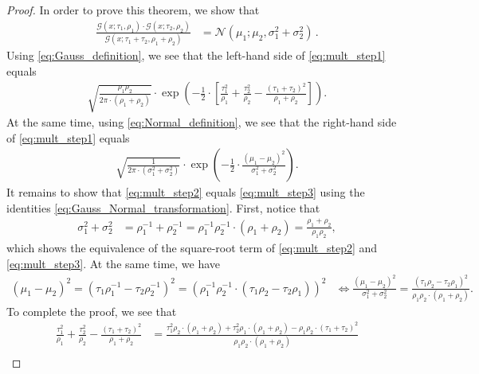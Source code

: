 \documentclass[a4paper]{article}
\newcommand{\Normal}[3]{{\mathcal N} \left({#1};{#2},{#3}\right)}
\newcommand{\Gauss}[3]{{\mathcal G} \left({#1};{#2},{#3}\right)}
\theoremstyle{definition}
\begin{document}
\begin{proof}\label{prf:gaussian_multiplication_theorem}
    In order to prove this theorem, we show that
    \begin{align}
        \frac{\Gauss{x}{\tau_1}{\rho_1} \cdot \Gauss{x}{\tau_2}{\rho_2}}{\Gauss{x}{\tau_1 + \tau_2}{\rho_1 + \rho_2}} & =  \Normal{\mu_1}{\mu_2}{\sigma_1^2 + \sigma_2^2}\,. \label{eq:mult_step1}
    \end{align}
    Using \eqref{eq:Gauss_definition}, we see that the left-hand side of \eqref{eq:mult_step1} equals
    \begin{align}
        \sqrt{\frac{\rho_1\rho_2}{2\pi\cdot\left(\rho_1 + \rho_2\right)}} \cdot \exp \left( -\frac{1}{2} \cdot \left[ \frac{\tau_1^2}{\rho_1} + \frac{\tau_2^2}{\rho_2} - \frac{\left( \tau_1 + \tau_2 \right)^2}{\rho_1 +\rho_2} \right] \right) .  \label{eq:mult_step2}
    \end{align}
    At the same time, using \eqref{eq:Normal_definition}, we see that the right-hand side of \eqref{eq:mult_step1} equals
    \begin{align}
        \sqrt{\frac{1}{2\pi \cdot \left( \sigma_1^2 + \sigma_2^2 \right)}} \cdot \exp \left( -\frac{1}{2}\cdot\frac{\left( \mu_1-\mu_2 \right)^2}{\sigma_1^2 + \sigma_2^2}\right) . \label{eq:mult_step3}
    \end{align}
    It remains to show that \eqref{eq:mult_step2} equals \eqref{eq:mult_step3} using the identities \eqref{eq:Gauss_Normal_transformation}. First, notice that
    \begin{align*}
        \sigma_1^2 + \sigma_2^2 & = \rho_1^{-1} + \rho_2^{-1} = \rho_1^{-1}\rho_2^{-1} \cdot \left(\rho_1 + \rho_2\right) = \frac{\rho_1 + \rho_2}{\rho_1\rho_2},
    \end{align*}
    which shows the equivalence of the square-root term of \eqref{eq:mult_step2} and \eqref{eq:mult_step3}. At the same time, we have 
    \begin{align*}
        \left( \mu_1-\mu_2 \right)^2 = \left( \tau_1\rho_1^{-1} - \tau_2\rho_2^{-1} \right)^2 = \left( \rho_1^{-1}\rho_2^{-1}\cdot \left( \tau_1\rho_2 - \tau_2\rho_1\right) \right)^2
         & \Leftrightarrow \frac{\left( \mu_1-\mu_2 \right)^2}{\sigma_1^2 + \sigma_2^2} = \frac{\left( \tau_1\rho_2 - \tau_2\rho_1 \right)^2}{\rho_1\rho_2 \cdot \left(\rho_1 + \rho_2\right)}.
    \end{align*}
    To complete the proof, we see that
    \begin{align*}
        \frac{\tau_1^2}{\rho_1} + \frac{\tau_2^2}{\rho_2} - \frac{\left( \tau_1 + \tau_2 \right)^2}{\rho_1 +\rho_2} & = \frac{\tau_1^2\rho_2\cdot\left(\rho_1 + \rho_2\right) + \tau_2^2\rho_1 \cdot \left(\rho_1 + \rho_2\right) - \rho_1\rho_2\cdot\left( \tau_1 + \tau_2 \right)^2}{\rho_1\rho_2 \cdot \left(\rho_1 + \rho_2\right)} \\

\end{align*}
\end{proof}
\end{document}
